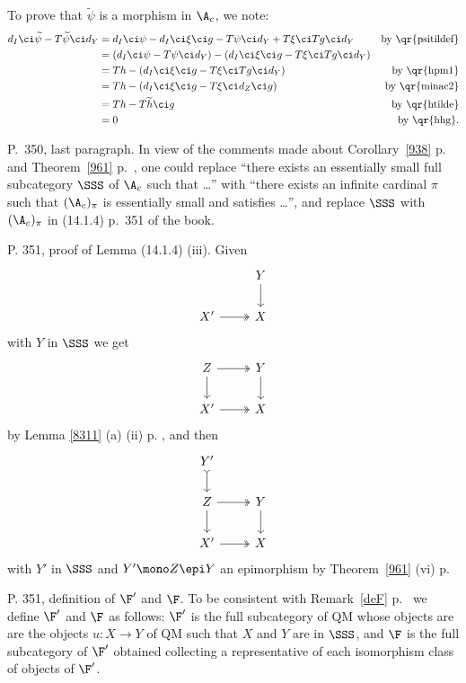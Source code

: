 \documentclass[12pt]{article}
\theoremstyle{remark}
\theoremstyle{definition}
\begin{document}
To prove that $\widetilde\psi$ is a morphism in $\A_c$, we note: 
\begin{align*}
d_I\ci\widetilde\psi-T\widetilde\psi\ci d_Y&=d_I\ci\psi-d_I\ci\xi\ci g-T\psi\ci d_Y+T\xi\ci Tg\ci d_Y&\text{by \qr{psitildef}}\\ 
&=(d_I\ci\psi-T\psi\ci d_Y)-(d_I\ci\xi\ci g-T\xi\ci Tg\ci d_Y)\\ 
&=Th-(d_I\ci\xi\ci g-T\xi\ci Tg\ci d_Y)&\text{by \qr{hpm1}}\\ 
&=Th-(d_I\ci\xi\ci g-T\xi\ci d_Z\ci g)&\text{by \qr{minac2}}\\ 
&=Th-T\widetilde h\ci g&\text{by \qr{htilde}}\\ 
&=0&\text{by \qr{hhg}}. 
\end{align*}



\begin{s} 
P.~350, last paragraph. In view of the comments made about Corollary~\ref{938} p.~ and Theorem~\ref{961} p.~, one could replace ``there exists an essentially small full subcategory $\SSS$ of $\A_c$ such that \dots'' with ``there exists an infinite cardinal $\pi$ such that $(\A_c)_\pi$ is essentially small and satisfies \dots'', and replace $\SSS$ with $(\A_c)_\pi$ in (14.1.4) p.~351 of the book.
\end{s}

%

\begin{s}
P. 351, proof of Lemma (14.1.4) (iii). Given 
$$
\begin{tikzcd}
&Y\ar[d]\\ 
X'\ar[r,two heads]&X
\end{tikzcd}
$$ 
with $Y$ in $\SSS$ we get 
$$
\begin{tikzcd}
Z\ar[d]\ar[r,two heads]&Y\ar[d]\\ 
X'\ar[r,two heads]&X
\end{tikzcd}
$$ 
by Lemma \ref{8311} (a) (ii) p. , and then 
$$
\begin{tikzcd}
Y'\ar[d,rightarrowtail]\\ 
Z\ar[d]\ar[r,two heads]&Y\ar[d]\\ 
X'\ar[r,two heads]&X
\end{tikzcd}
$$ 
with $Y'$ in $\SSS$ and $Y'\mono Z\epi Y$ an epimorphism by Theorem~\ref{961} (vi) p.~
\end{s}

%

\begin{s}
P. 351, definition of $\F'$ and $\F$. To be consistent with Remark~\ref{deF} p.~ we define $\F'$ and $\F$ as follows: $\F'$ is the full subcategory of QM whose objects are are the objects $u:X\to Y$ of QM such that $X$ and $Y$ are in $\SSS$, and $\F$ is the full subcategory of $\F'$ obtained collecting a representative of each isomorphism class of objects of $\F'$.
\end{s}
\end{document}
